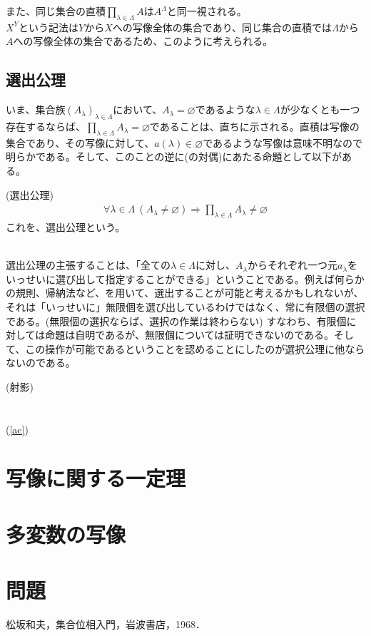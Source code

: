 \documentclass[a4j]{jsarticle}
\begin{document}
 また、同じ集合の直積$\prod_{\lambda \in \Lambda}A$は$A^\Lambda$と同一視される。\\
$X^Y$という記法は$Y$から$X$への写像全体の集合であり、同じ集合の直積では$\Lambda$から$A$への写像全体の集合であるため、このように考えられる。

\subsection{選出公理}

いま、集合族$(A_\lambda)_{\lambda \in \Lambda}$において、$A_\lambda = \varnothing$であるような$\lambda \in \Lambda$が少なくとも一つ存在するならば、$\prod_{\lambda \in \Lambda}A_\lambda = \varnothing$であることは、直ちに示される。直積は写像の集合であり、その写像に対して、$a(\lambda) \in \varnothing$であるような写像は意味不明なので明らかである。そして、このことの逆に(の対偶)にあたる命題として以下がある。\\

\begin{itembox}[l]{ (選出公理)}
	\begin{align}
		\label{ac}
		\forall \lambda \in \Lambda\:(A_\lambda \neq \varnothing) \Rightarrow \prod_{\lambda \in \Lambda}A_\lambda \neq \varnothing \tag{AC}
	\end{align}
	これを、選出公理という。
\end{itembox}\\

 選出公理の主張することは、「全ての$\lambda \in \Lambda$に対し、$A_\lambda$からそれぞれ一つ元$a_\lambda$をいっせいに選び出して指定することができる」ということである。例えば何らかの規則、帰納法など、を用いて、選出することが可能と考えるかもしれないが、それは「いっせいに」無限個を選び出しているわけではなく、常に有限個の選択である。(無限個の選択ならば、選択の作業は終わらない) すなわち、有限個に対しては命題は自明であるが、無限個については証明できないのである。そして、この操作が可能であるということを認めることにしたのが選択公理に他ならないのである。

\begin{itembox}[l]{ (射影)}
	\begin{align}
	\end{align}
\end{itembox}\\
(\ref{ac})

\section{写像に関する一定理}

\section{多変数の写像}

\section{問題}


\begin{thebibliography}{99}
	松坂和夫，集合位相入門，岩波書店，1968．
\end{thebibliography}
\end{document}
